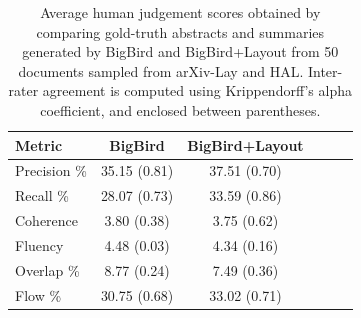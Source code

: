 \begin{table}[ht]
\centering
\small
\begin{tabular}{lccccc}
\toprule
\textbf{Metric}        & \textbf{BigBird} & \textbf{BigBird+Layout} \\ 
\midrule
Precision \%    &    35.15 \scriptsize{(0.81)}            &      37.51 \scriptsize{(0.70)}                   \\
Recall \%       &    28.07 \scriptsize{(0.73)}             &     33.59 \scriptsize{(0.86)}                   \\
Coherence     &     3.80 \scriptsize{(0.38)}             &      3.75 \scriptsize{(0.62)}                   \\ 
Fluency       &     4.48 \scriptsize{(0.03)}             &      4.34 \scriptsize{(0.16)}                   \\
Overlap \%     &    8.77 \scriptsize{(0.24)}             &     7.49 \scriptsize{(0.36)}                    \\ 
Flow \%             &   30.75 \scriptsize{(0.68)}          &    33.02 \scriptsize{(0.71)}                     \\
\bottomrule
\end{tabular}
\caption{Average human judgement scores obtained by comparing gold-truth abstracts and summaries generated by BigBird and BigBird+Layout from 50 documents sampled from arXiv-Lay and HAL. Inter-rater agreement	is computed using Krippendorff's alpha coefficient, and enclosed between parentheses.}
\label{tab:chapter5-human-eval-scores}
\end{table}

